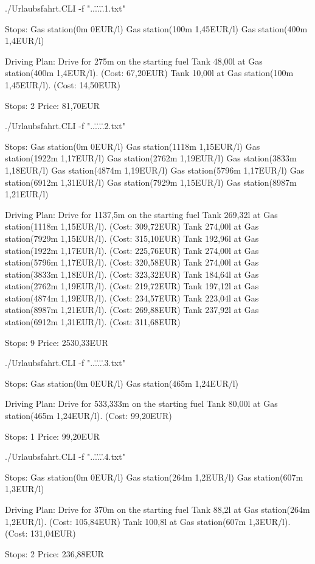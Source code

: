 \documentclass[a4paper,10pt,ngerman]{scrartcl}
\begin{document}
\begin{lstcs}
./Urlaubsfahrt.CLI -f "..\..\..\..\..\examples\fahrt1.txt"

Stops:
  Gas station(0m 0EUR/l)
  Gas station(100m 1,45EUR/l)
  Gas station(400m 1,4EUR/l)

Driving Plan:
  Drive for 275m on the starting fuel
  Tank 48,00l at Gas station(400m 1,4EUR/l). (Cost: 67,20EUR)
  Tank 10,00l at Gas station(100m 1,45EUR/l). (Cost: 14,50EUR)

  Stops: 2
  Price: 81,70EUR
\end{lstcs}
\begin{lstcs}
./Urlaubsfahrt.CLI -f "..\..\..\..\..\examples\fahrt2.txt"

Stops:
  Gas station(0m 0EUR/l)
  Gas station(1118m 1,15EUR/l)
  Gas station(1922m 1,17EUR/l)
  Gas station(2762m 1,19EUR/l)
  Gas station(3833m 1,18EUR/l)
  Gas station(4874m 1,19EUR/l)
  Gas station(5796m 1,17EUR/l)
  Gas station(6912m 1,31EUR/l)
  Gas station(7929m 1,15EUR/l)
  Gas station(8987m 1,21EUR/l)

Driving Plan:
  Drive for 1137,5m on the starting fuel
  Tank 269,32l at Gas station(1118m 1,15EUR/l). (Cost: 309,72EUR)
  Tank 274,00l at Gas station(7929m 1,15EUR/l). (Cost: 315,10EUR)
  Tank 192,96l at Gas station(1922m 1,17EUR/l). (Cost: 225,76EUR)
  Tank 274,00l at Gas station(5796m 1,17EUR/l). (Cost: 320,58EUR)
  Tank 274,00l at Gas station(3833m 1,18EUR/l). (Cost: 323,32EUR)
  Tank 184,64l at Gas station(2762m 1,19EUR/l). (Cost: 219,72EUR)
  Tank 197,12l at Gas station(4874m 1,19EUR/l). (Cost: 234,57EUR)
  Tank 223,04l at Gas station(8987m 1,21EUR/l). (Cost: 269,88EUR)
  Tank 237,92l at Gas station(6912m 1,31EUR/l). (Cost: 311,68EUR)

  Stops: 9
  Price: 2530,33EUR
\end{lstcs}
\begin{lstcs}
./Urlaubsfahrt.CLI -f "..\..\..\..\..\examples\fahrt3.txt"

Stops:
  Gas station(0m 0EUR/l)
  Gas station(465m 1,24EUR/l)

Driving Plan:
  Drive for 533,333m on the starting fuel
  Tank 80,00l at Gas station(465m 1,24EUR/l). (Cost: 99,20EUR)

  Stops: 1
  Price: 99,20EUR
\end{lstcs}
\begin{lstcs}
./Urlaubsfahrt.CLI -f "..\..\..\..\..\examples\fahrt4.txt"

Stops:
  Gas station(0m 0EUR/l)
  Gas station(264m 1,2EUR/l)
  Gas station(607m 1,3EUR/l)

Driving Plan:
  Drive for 370m on the starting fuel
  Tank 88,2l at Gas station(264m 1,2EUR/l). (Cost: 105,84EUR)
  Tank 100,8l at Gas station(607m 1,3EUR/l). (Cost: 131,04EUR)

  Stops: 2
  Price: 236,88EUR
\end{lstcs}
\end{document}
